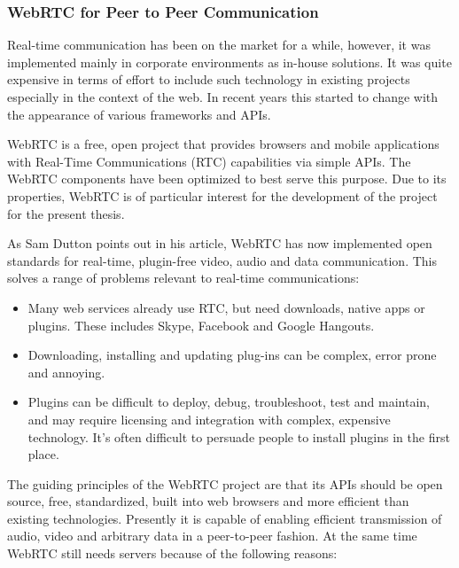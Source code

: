 \newpage

\subsubsection{WebRTC for Peer to Peer Communication} %

Real-time communication has been on the market for a while, however, it was
implemented mainly in corporate environments as in-house solutions. It was quite
expensive in terms of effort to include such technology in existing projects
especially in the context of the web. In recent years this started to change
with the appearance of various frameworks and APIs.

WebRTC\cite{webrtc_org} is a free, open project that provides browsers and
mobile applications with Real-Time Communications (RTC) capabilities via simple
APIs. The WebRTC components have been optimized to best serve this purpose.
Due to its properties, WebRTC is of particular interest for the development
of the project for the present thesis.

As Sam Dutton points out in his article\cite{webrtc_basics}, WebRTC has now
implemented open standards for real-time, plugin-free video, audio and data
communication. This solves a range of problems relevant to real-time
communications:

\begin{itemize}
    \item Many web services already use RTC, but need downloads, native apps or
        plugins. These includes Skype, Facebook and Google Hangouts.

    \item Downloading, installing and updating plug-ins can be complex, error
        prone and annoying.

    \item Plugins can be difficult to deploy, debug, troubleshoot, test and
        maintain, and may require licensing and integration with complex,
        expensive technology. It's often difficult to persuade people to install
        plugins in the first place.
\end{itemize}

The guiding principles of the WebRTC project are that its APIs should be open
source, free, standardized, built into web browsers and more efficient than
existing technologies. Presently it is capable of enabling efficient
transmission of audio, video and arbitrary data in a peer-to-peer fashion. At
the same time WebRTC still needs servers because of the following
reasons\cite{webrtc_realworld}:

